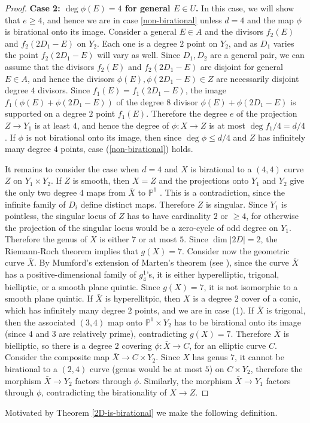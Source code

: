 \documentclass[11pt]{amsart}
\newcommand{\PP}{\mathbb{P}}
\newcommand{\pp}{\mathbb{P}}
\theoremstyle{definition}
\theoremstyle{remark}
\begin{document}
\begin{proof}
\smallskip
   
\noindent
\textbf{\boldmath Case 2: $\deg \phi(E)=4$ for general \(E \in U\).} In this case, we will show that \(e\geqslant 4\), and hence we are in case \eqref{non-birational} unless \(d=4\) and the map \(\phi\) is birational onto its image. Consider a general $E \in A$ and the divisors $f_2(E)$ and $f_2(2D_1-E)$ on $Y_2$. Each one is a degree $2$ point on $Y_2$, and as $D_1$ varies the point $f_2(2D_1-E)$ will vary as well. Since $D_1, D_2$ are a general pair, we can assume that the divisors $f_2(E)$ and $f_2(2D_1-E)$ are disjoint for general \(E \in A\), and hence the divisors $\phi(E), \phi(2D_1-E) \in Z$ are necessarily disjoint degree \(4\) divisors. Since $f_1(E)=f_1(2D_1-E)$, the image $f_1(\phi(E)+\phi(2D_1-E))$ of the degree \(8\) divisor \(\phi(E)+\phi(2D_1-E)\) is supported on a degree $2$ point $f_1(E)$. Therefore the degree $e$ of the projection $Z \to Y_1$ is at least $4$, and hence the degree of $\phi: X \to Z$ is at most $\deg f_1 / 4 = d/4$. If $\phi$ is not birational onto its image, then since $\deg \phi \leqslant d/4$ and $Z$ has infinitely many degree $4$ points, case (\ref{non-birational}) holds. 
    
    It remains to consider the case when \(d=4\) and $X$ is birational to a $(4,4)$ curve $Z$ on $Y_1 \times Y_2$. If $Z$ is smooth, then $X=Z$ and the projections onto \(Y_1\) and \(Y_2\) give the only two degree \(4\) maps from $\bar{X}$ to \(\pp^1\) \cite[Chapter IV, Exercise F-2]{ACGH}.  This is a contradiction, since the infinite family of \(D_i\) define distinct maps. Therefore $Z$ is singular. Since $Y_1$ is pointless, the singular locus of $Z$ has to have cardinality $2$ or $\geqslant 4$, for otherwise the projection of the singular locus would be a zero-cycle of odd degree on $Y_1$. Therefore the genus of $X$ is either $7$ or at most $5$. Since $\dim |2D|=2$, the Riemann-Roch theorem implies that $g(X)=7$. Consider now the geometric curve $\bar{X}$. By Mumford's extension of Marten's theorem (see \cite[Chapter IV, Theorem 5.2]{ACGH}), since the curve $\bar{X}$ has a positive-dimensional family of \(g^1_4\)'s, it is either hyperelliptic, trigonal, bielliptic, or a smooth plane quintic.  Since \(g(X) = 7\), it is not isomorphic to a smooth plane quintic. If \(\bar{X}\) is hyperellitpic, then \(X\) is a degree \(2\) cover of a conic, which has infinitely many degree \(2\) points, and we are in case (1).  If $\bar{X}$ is trigonal, then the associated $(3,4)$ map onto $\PP^1\times Y_2$ has to be birational onto its image (since $4$ and $3$ are relatively prime), contradicting $g(X)=7$. Therefore $\bar{X}$ is bielliptic, so there is a degree \(2\) covering $\phi: \bar{X} \to C$, for an elliptic curve \(C\). Consider the composite map $\bar{X} \to C \times Y_2$. Since $X$ has genus $7$, it cannot be birational to a $(2,4)$ curve (genus would be at most \(5\)) on $C \times Y_2$, therefore the morphism $\bar{X} \to Y_2$ factors through $\phi$. Similarly, the morphism $\bar{X} \to Y_1$ factors through $\phi$, contradicting the birationality of $X \to Z$.
\end{proof}
Motivated by Theorem \ref{2D-is-birational} we make the following definition.
\end{document}
